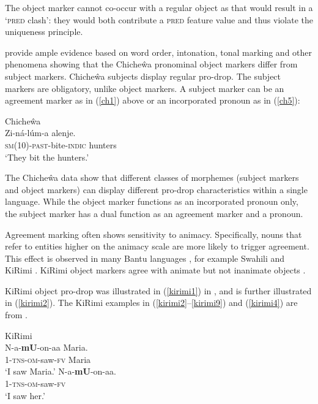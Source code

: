 \documentclass[output=paper,hidelinks]{langscibook}
\begin{document}
 \noindent  The object marker  cannot  co-occur  with a regular  object  as  that would result  in  a `\textsc{pred}  clash': they would  both contribute a \textsc{pred} feature value  and thus  violate   the uniqueness principle.   
 
 
\citet{BM87}  provide  ample evidence  based  on  word order, intonation,   tonal marking and other phenomena   showing that the  Chiche\^{w}a  pronominal object  markers differ  from subject markers.  Chiche\^{w}a subjects display regular pro-drop.  The subject markers are  obligatory, unlike object  markers.   A subject marker    can be  an agreement marker  as in (\ref{ch1}) above or an   incorporated  pronoun  as in  (\ref{ch5}):
 
 
\ea \label{ch5}Chiche\^wa\\
\gll   Zi-ná-lúm-a alenje. \\
  \textsc{sm(10)}-\textsc{past}-bite-\textsc{indic} hunters   \\
\glt `They bit  the hunters.'
 \z
 
The Chiche\^{w}a data show that different  classes of morphemes (subject markers and object  markers)  can  display different  pro-drop   characteristics within  a  single language. While   the object  marker functions as an  incorporated  pronoun only,  the subject  marker has a dual  function  as an  agreement  marker  and  a pronoun.  


Agreement marking  often shows   sensitivity to animacy.  Specifically, nouns that refer to entities higher on the animacy scale are more likely to trigger agreement.  This effect is observed in many   Bantu languages \citep{riedel09}, for example Swahili  \citep{keach95} and KiRimi \citep{hualde89}. 
 KiRimi  object markers  agree with  animate but not inanimate objects \citep{hualde89}.
 
 KiRimi object pro-drop was illustrated in   (\ref{kirimi1})  in , and is further illustrated  in  (\ref{kirimi2}).  The   KiRimi  examples  in (\ref{kirimi2}--\ref{kirimi9}) and (\ref{kirimi4}) are   from \citet{hualde89}.
 
 
  
 \ea   \label{kirimi2}KiRimi\\
 \ea\label{kirimi2a} \gll  N-a-{\bf mU}-on-aa Maria.   \\
1-\textsc{tns}-\textsc{om}-saw-\textsc{fv}  Maria    \\
\glt `I saw Maria.'
\ex \label{kirimi2b}   \gll   N-a-{\bf mU}-on-aa.   \\
1-\textsc{tns}-\textsc{om}-saw-\textsc{fv}       \\
\glt `I saw her.'
 \z\z
\end{document}
